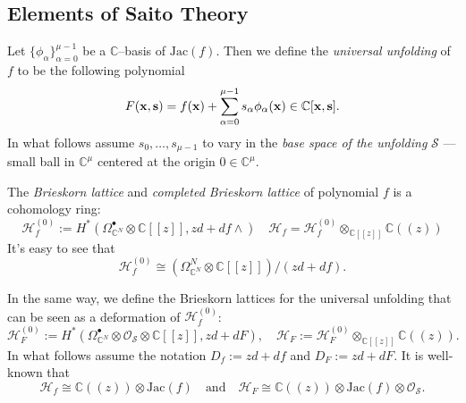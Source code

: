 \documentclass[reqno,12pt]{amsart}
\numberwithin{equation}{section}
\theoremstyle{plain}
\newtheorem{proposition}[theorem]{Proposition}
\theoremstyle{definition}
\newtheorem{remark}[theorem]{Remark}
\newcommand\DistTo{\xrightarrow{
   \,\smash{\raisebox{-0.65ex}{\ensuremath{\scriptstyle\sim}}}\,}}
\newcommand{\CC}{{\mathbb{C}}}
\newcommand{\Jac}{\mathrm{Jac}}
\newcommand{\bx}{{\bf x}}
\def\H{{\mathcal H}}
\def\O{{\mathcal O}}
\numberwithin{equation}{section}
\begin{document}
\subsection{Elements of Saito Theory} 
Let $\{\phi_\alpha\}_{\alpha=0}^{\mu-1}$ be a $\CC$--basis of $\Jac(f)$. Then we define the \emph{universal unfolding} of $f$ to be the following polynomial
\[
    F(\bx,\mathbf{s}) = f(\bx) + \sum_{\alpha = 0}^{\mu-1} s_\alpha\phi_\alpha(\bx) \in \CC[\bx,\mathbf{s}].
\] 
In what follows assume $s_0,\dots, s_{\mu-1}$ to vary in the \textit{base space of the unfolding} $\mathcal{S}$ --- small ball in $\CC^\mu$ centered at the origin $0 \in \CC^\mu$. 

The \emph{Brieskorn lattice} and \emph{completed Brieskorn lattice} of polynomial $f$ is a cohomology ring:
\[ 
\H^{(0)}_f := H^*(\Omega^{\bullet}_{\CC^N}\otimes \CC [[z]], z d + df\wedge) 
    \quad \H_f = \H^{(0)}_f \otimes_{\CC [[z]]} \CC((z))
\]
It's easy to see that 
\[
    \H^{(0)}_f \cong (\Omega^{N}_{\CC^N}\otimes \CC [[z]])/(z d + df).
\]

In the same way, we define the Brieskorn lattices for the universal unfolding that can be seen as a deformation of $\H^{(0)}_f$:
\[ 
    \H^{(0)}_F := H^*(\Omega^{\bullet}_{\CC^N}\otimes \O_{\mathcal S} \otimes \CC [[z]], z d + dF), 
     \quad 
     \H_F := \H^{(0)}_F \otimes_{\CC [[z]]} \CC((z)).
\]     
In what follows assume the notation $D_f := z d + df$ and $D_F := z d + dF$. 
It is well-known that 
\[
\H_{f} \cong \CC((z)) \otimes \Jac(f) \quad \text{and} \quad \H_{F} \cong \CC((z)) \otimes \Jac(f) \otimes \mathcal{O_{S}}.
\]
% 
\end{document}
